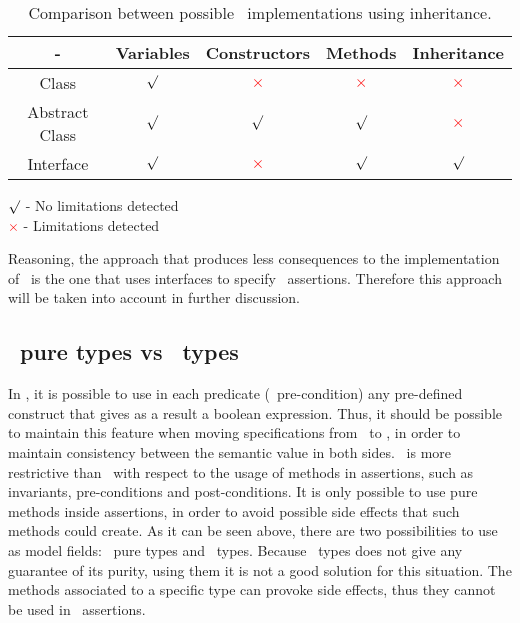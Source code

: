 \begin{table}[h!b!p!]\centering
\begin{tabular}{| c | c | c | c | c |}
\hline
- & Variables & Constructors & Methods & Inheritance \\
\hline
\hline
Class & \textcolor{green}{$\surd$} & \textcolor{red}{$\times$} & \textcolor{red}{$\times$} & \textcolor{red}{$\times$} \\
\hline
Abstract Class & \textcolor{green}{$\surd$} & \textcolor{green}{$\surd$} & \textcolor{green}{$\surd$} & \textcolor{red}{$\times$}\\
\hline
Interface & \textcolor{green}{$\surd$} & \textcolor{red}{$\times$} & \textcolor{green}{$\surd$} & \textcolor{green}{$\surd$}\\
\hline
\end{tabular}
\begin{ovalenv}[2in]
\textcolor{green}{$\surd$} - No limitations detected\\
\textcolor{red}{$\times$} - Limitations detected
\end{ovalenv}
\caption{Comparison between possible \jml\ implementations using inheritance.}
\label{tab:comp_c_ac_i}
\end{table}

Reasoning, the approach that produces less consequences to the implementation of \jml\ is the one that uses interfaces to specify \jml\ assertions. Therefore this approach will be taken into account in further discussion.

\subsection{\jml\ pure types vs \java\ types}
\label{chapter2:sec:purevsjava}

In \vpp, it is possible to use in each predicate (\eg\ pre-condition) any pre-defined construct that gives as a result a boolean expression.
Thus, it should be possible to maintain this feature when moving specifications from \vpp\ to \jml, in order to maintain consistency between the semantic value in both sides. \jml\ is more restrictive than \vpp\ with respect to the usage of methods in assertions, such as invariants, pre-conditions and post-conditions. It is only possible to use pure methods inside assertions, in order to avoid possible side effects that such methods could create.
As it can be seen above, there are two possibilities to use as model fields: \jml\ pure types and \java\ types. Because \java\ types does not give any guarantee of its purity, using them it is not a good solution for this situation. The methods associated to a specific type can provoke side effects, thus they cannot be used in \jml\ assertions.

